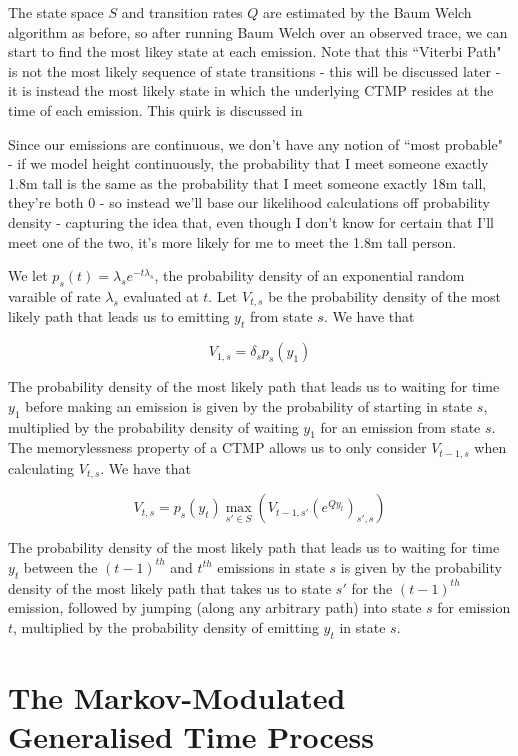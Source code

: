 The state space $S$ and transition rates $Q$ are estimated by the Baum Welch algorithm as before, so after running Baum Welch over an observed trace, we can start to find the most likey state at each emission. Note that this ``Viterbi Path" is not the most likely sequence of state transitions - this will be discussed later - it is instead the most likely state in which the underlying CTMP resides at the time of each emission. This quirk is discussed in %

Since our emissions are continuous, we don't have any notion of ``most probable" - if we model height continuously, the probability that I meet someone exactly 1.8m tall is the same as the probability that I meet someone exactly 18m tall, they're both 0 - so instead we'll base our likelihood calculations off probability density - capturing the idea that, even though I don't know for certain that I'll meet one of the two, it's more likely for me to meet the 1.8m tall person.

We let $p_s(t)= \lambda_s e^{-t\lambda_s}$, the probability density of an exponential random varaible of rate $\lambda_s$ evaluated at $t$. Let $V_{t,s}$ be the probability density of the most likely path that leads us to emitting $y_t$ from state $s$. We have that

$$
V_{1,s} =  \delta_{s}p_s(y_1)
$$

The probability density of the most likely path that leads us to waiting for time $y_1$ before making an emission is given by the probability of starting in state $s$, multiplied by the probability density of waiting $y_1$ for an emission from state $s$. The memorylessness property of a CTMP allows us to only consider $V_{t-1,s}$ when calculating $V_{t,s}$. We have that

$$
V_{t,s} = p_s(y_t) \max_{s'\in S} (V_{t-1,s'}(e^{Qy_t})_{s',s})
$$

The probability density of the most likely path that leads us to waiting for time $y_t$ between the $(t-1)^{th}$ and $t^{th}$ emissions in state $s$ is given by the probability density of the most likely path that takes us to state $s'$ for the $(t-1)^{th}$ emission, followed by jumping (along any arbitrary path) into state $s$ for emission $t$, multiplied by the probability density of emitting $y_t$ in state $s$.

\section{The Markov-Modulated Generalised Time Process}